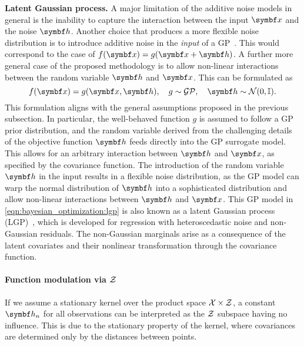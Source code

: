 \textbf{Latent Gaussian process.}
A major limitation of the additive noise models in general is the inability to capture the interaction between the input $\mat{x}$ and the noise $\mat{h}$.
Another choice that produces a more flexible noise distribution is to introduce additive noise in the \emph{input} of a GP~\parencite{mchutchon_gaussian_2011,girard_gaussian_2003,girard_approximate_2004}.
This would correspond to the case of $f(\mat{x}) = g(\mat{x} + \mat{h})$.
A further more general case of the proposed methodology is to allow non-linear interactions between the random variable $\mat{h}$ and $\mat{x}$.
This can be formulated as
\begin{equation}
    f(\mat{x}) = g(\mat{x}, \mat{h}),\quad g \sim \mathcal{GP},\quad \mat{h} \sim \mathcal{N}(0, \mathbb{I}). \label{eqn:bayesian_optimization:lgp}
\end{equation}
This formulation aligns with the general assumptions proposed in the previous subsection.
In particular, the well-behaved function $g$ is assumed to follow a GP prior distribution,
and the random variable derived from the challenging details of the objective function $\mat{h}$ feeds directly into the GP surrogate model.
This allows for an arbitrary interaction between $\mat{h}$ and $\mat{x}$, as specified by the covariance function.
The introduction of the random variable $\mat{h}$ in the input results in a flexible noise distribution, as the GP model can warp the normal distribution of $\mat{h}$ into a sophisticated distribution and allow non-linear interactions between $\mat{h}$ and $\mat{x}$.
%
This GP model in \cref{eqn:bayesian_optimization:lgp} is also known as a latent Gaussian process (LGP)~\parencite{pfingsten_nonstationary_2006,wang_gaussian_2012,yousefi_unsupervised_2016,bodin_latent_2017}, which is developed for regression with heteroscedastic noise and non-Gaussian residuals.
The non-Gaussian marginals arise as a consequence of the latent covariates and their nonlinear transformation through the covariance function.


\paragraph{Function modulation via $\mathcal{Z}$}
If we assume a stationary kernel over the product space $\mathcal{X} \times \mathcal{Z}$, a constant $\mat{h}_n$ for all observations can be interpreted as the $\mathcal{Z}$ subspace having no influence.
This is due to the stationary property of the kernel, where covariances are determined only by the distances between points.

